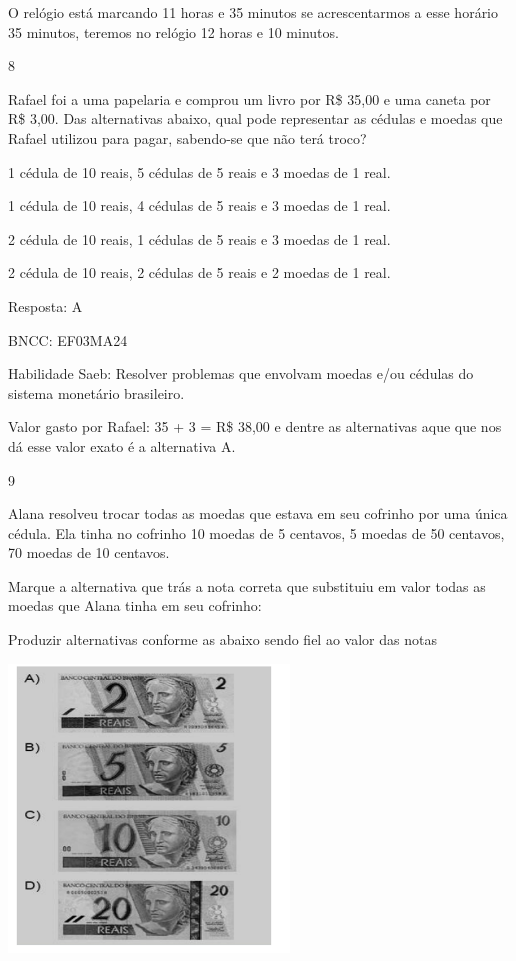 \begin{escolha}
O relógio está marcando 11 horas e 35 minutos se acrescentarmos a esse
horário 35 minutos, teremos no relógio 12 horas e 10 minutos.

\num{8}

Rafael foi a uma papelaria e comprou um livro por R\$ 35,00 e uma caneta
por R\$ 3,00. Das alternativas abaixo, qual pode representar as cédulas
e moedas que Rafael utilizou para pagar, sabendo-se que não terá troco?

\begin{escolha}

\item
  1 cédula de 10 reais, 5 cédulas de 5 reais e 3 moedas de 1 real.
\item
  1 cédula de 10 reais, 4 cédulas de 5 reais e 3 moedas de 1 real.
\item
  2 cédula de 10 reais, 1 cédulas de 5 reais e 3 moedas de 1 real.
\item
  2 cédula de 10 reais, 2 cédulas de 5 reais e 2 moedas de 1 real.
\end{escolha}

Resposta: A

BNCC: EF03MA24

Habilidade Saeb: Resolver problemas que envolvam moedas e/ou cédulas do
sistema monetário brasileiro.

Valor gasto por Rafael: 35 + 3 = R\$ 38,00 e dentre as alternativas aque
que nos dá esse valor exato é a alternativa A.

\num{9}

Alana resolveu trocar todas as moedas que estava em seu cofrinho por uma
única cédula. Ela tinha no cofrinho 10 moedas de 5 centavos, 5 moedas de
50 centavos, 70 moedas de 10 centavos.

Marque a alternativa que trás a nota correta que substituiu em valor
todas as moedas que Alana tinha em seu cofrinho:

Produzir alternativas conforme as abaixo sendo fiel ao valor das notas

\includegraphics[width=2.93590in,height=3.00930in]{media/image135.png}


\end{escolha}
